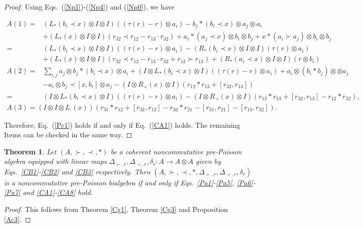 \documentclass[12pt]{amsart}
\newtheorem{thm}{Theorem}[section]
\theoremstyle{definition}
\begin{document}
\begin{proof}
Using Eqs.~(\ref{Np1})-(\ref{Np4}) and (\ref{Np0}), we have
\begin{small}
\begin{align*}A(1)=&(L_{\ast}(b_i\prec x)\otimes I\otimes I)((\tau(r)-r)\otimes a_i)
-b_j\ast(b_i\prec x)\otimes a_j\otimes a_i\\&+(L_{\ast}(x)\otimes I\otimes I)(r_{32}\prec r_{12}-r_{13}\cdot r_{32})
+a_i\ast (a_j\prec x)\otimes b_i\otimes b_j+x\ast(a_i\succ a_j)\otimes b_i\otimes b_j
\\=&(L_{\ast}(b_i\prec x)\otimes I\otimes I)((\tau(r)-r)\otimes a_i)
-(R_{\ast}(b_i\prec x)\otimes I\otimes I)(\tau(r)\otimes a_i)
\\&+(L_{\ast}(x)\otimes I\otimes I)(r_{32}\prec r_{12}-r_{13}\cdot r_{32}+r_{12}\succ r_{13})
+(R_{\ast}(a_i\prec x)\otimes I\otimes I)(r\otimes b_i)
\end{align*}
\begin{align*}A(2)=&\sum_{i,j}a_j\otimes b_j\ast (b_i\prec x)\otimes a_i+(I\otimes L_{\ast}(b_i\prec x) \otimes I)((\tau(r)-r)\otimes a_i)
+a_i\otimes(b_i\ast b_j)\otimes \otimes a_j\\&-a_i\otimes b_j\prec [x,b_i]\otimes a_j
-(I\otimes R_{\prec}(x)\otimes I)(r_{12}\ast r_{13}+[r_{32},r_{13}])
\\=&(I\otimes L_{\ast}(b_i\prec x) \otimes I)((\tau(r)-r)\otimes a_i)
-(I\otimes R_{\prec}(x)\otimes I)(r_{12}\ast r_{13}+[r_{32},r_{13}]-r_{12}\ast r_{32})
,\end{align*}
\begin{align*}A(3)=(I\otimes I\otimes L_{\cdot}(x))(r_{31}\ast r_{12}+[r_{32},r_{12}]-r_{32}\ast r_{21}-[r_{31},r_{21}]
-[r_{13},r_{32}])
.\end{align*}\end{small}
Therefore, Eq.~(\ref{Pc1}) holds if and only if Eq.~(\ref{CA1}) holds. The remaining Items can be checked in the same way. \end{proof}

\begin{thm} \label{Bc1} Let $(A,\succ,\prec,\ast)$ be a coherent noncommutative pre-Poisson algebra equipped with
linear maps $\Delta_{\succ,r},\Delta_{\prec,r},\delta_r:A\longrightarrow A\otimes A$ given 
by Eqs.~\eqref{CB1}-\eqref{CB2} and \eqref{CB3} respectively. 
Then $(A, \succ,\prec,\ast,\Delta_{\succ,r},\Delta_{\prec,r},\delta_r)$ 
 is a noncommutative pre-Poisson bialgebra if and only if 
 Eqs.~\eqref{Pa1}-\eqref{Pa5}, \eqref{Pa6}-\eqref{Pa7} and
 \eqref{CA1}-\eqref{CA8} hold.\end{thm}
\begin{proof} This follows from Theorem \ref{Cg1}, Theorem \ref{Cg3} and Proposition \ref{Ac3}.\end{proof}
\end{document}
